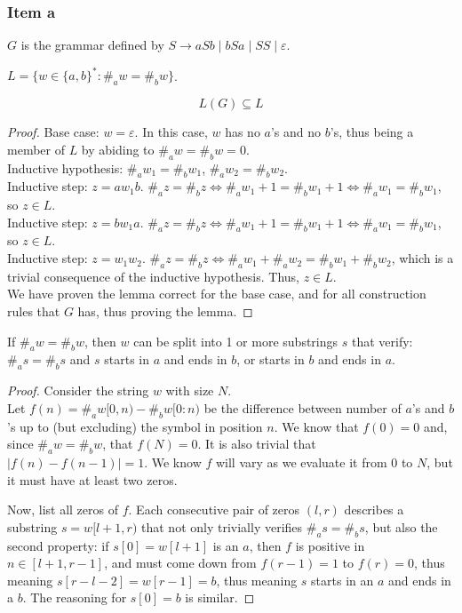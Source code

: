\documentclass[docid=TP08]{tcom_TP}
\begin{document}
{\subsubsection{Item a}
\begin{definition}
$G$ is the grammar defined by $S \rightarrow aSb\mid bSa\mid SS\mid \varepsilon$.
\end{definition}
\begin{definition}
$L=\{w \in \{a,b\}^*\colon \#_aw=\#_bw\}$.
\end{definition}
\begin{lemma} \label{lem:AimpB}
\begin{equation*}
	L(G) \subseteq L
\end{equation*}
\end{lemma}
\begin{proof}
Base case: $w=\varepsilon$. In this case, $w$ has no $a$'s and no $b$'s, thus being a member of $L$ by abiding to $\#_aw=\#_bw=0$.\\
Inductive hypothesis: $\#_aw_1=\#_bw_1$, $\#_aw_2=\#_bw_2$.\\
Inductive step: $z=aw_1b$. $\#_az=\#_bz \iff \#_aw_1+1=\#_bw_1+1 \iff \#_aw_1=\#_bw_1$, so $z \in L$.\\
Inductive step: $z=bw_1a$. $\#_az=\#_bz \iff \#_aw_1+1=\#_bw_1+1 \iff \#_aw_1=\#_bw_1$, so $z \in L$.\\
Inductive step: $z=w_1w_2$. $\#_az=\#_bz \iff \#_aw_1+\#_aw_2=\#_bw_1+\#_bw_2$, which is a trivial consequence of the inductive hypothesis. Thus, $z \in L$.\\
We have proven the lemma correct for the base case, and for all construction rules that $G$ has, thus proving the lemma.
\end{proof}
\begin{lemma} \label{lem:simplemma}
If $\#_aw=\#_bw$, then $w$ can be split into 1 or more substrings $s$ that verify: $\#_as=\#_bs$ and $s$ starts in $a$ and ends in $b$, or starts in $b$ and ends in $a$.
\end{lemma}
\begin{proof}
Consider the string $w$ with size $N$.\\
Let $f(n)=\#_aw[0,n)-\#_bw[0:n)$ be the difference between number of $a$'s and $b$'s up to (but excluding) the symbol in position $n$. We know that $f(0)=0$ and, since $\#_aw=\#_bw$, that $f(N)=0$. It is also trivial that $|f(n)-f(n-1)| = 1$. We know $f$ will vary as we evaluate it from $0$ to $N$, but it must have at least two zeros.\par
Now, list all zeros of $f$. Each consecutive pair of zeros $(l,r)$ describes a substring $s=w[l+1,r)$ that not only trivially verifies $\#_as=\#_bs$, but also the second property: if $s[0] = w[l+1]$ is an $a$, then $f$ is positive in $n \in [l+1,r-1]$, and must come down from $f(r-1)=1$ to $f(r)=0$, thus meaning $s[r-l-2]=w[r-1]=b$, thus meaning $s$ starts in an $a$ and ends in a $b$. The reasoning for $s[0]=b$ is similar.

\end{proof}}
\end{document}
